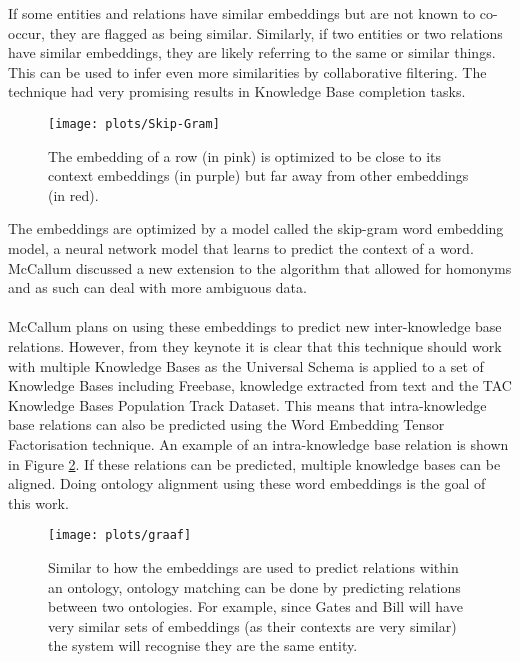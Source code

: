 \documentclass{article}
\begin{document}
 If some entities and relations have similar embeddings but are not known to co-occur, they are flagged as being similar. Similarly, if two entities or two relations have similar embeddings, they are likely referring to the same or similar things. This can be used to infer even more similarities by collaborative filtering. The technique had very promising results in Knowledge Base completion tasks.
  
 \begin{figure}[H]
 \centering
 \texttt{[image: plots/Skip-Gram]}
 \label{Skip-Gram-img}
 \caption{The embedding of a row (in pink) is optimized to be close to its context embeddings (in purple) but far away from other embeddings (in red).}
 \end{figure}
 
 The embeddings are optimized by a model called the skip-gram word embedding model\cite{w2v}, a neural network model that learns to predict the context of a word. McCallum discussed a new extension to the algorithm that allowed for homonyms and as such can deal with more ambiguous data\cite{mccallumweblecture}.
 \paragraph{}
 McCallum plans on using these embeddings to predict new inter-knowledge base relations. However, from they keynote it is clear that this technique should work with multiple Knowledge Bases as the Universal Schema is applied to a set of Knowledge Bases including Freebase, knowledge extracted from text and the TAC Knowledge Bases Population Track Dataset. This means that intra-knowledge base relations can also be predicted using the Word Embedding Tensor Factorisation technique.
 An example of an intra-knowledge base relation is shown in Figure \ref{merge_graph}. If these relations can be predicted, multiple knowledge bases can be aligned. Doing ontology alignment using these word embeddings is the goal of this work.
 
 \begin{figure}[H]
 \centering
 \texttt{[image: plots/graaf]}
 \caption{ Similar to how the embeddings are used to predict relations within an ontology, ontology matching can be done by predicting relations between two ontologies. For example, since Gates and Bill will have very similar sets of embeddings (as their contexts are very similar) the system will recognise they are the same entity.}
 \label{merge_graph}
 \end{figure}
 
\end{document}

